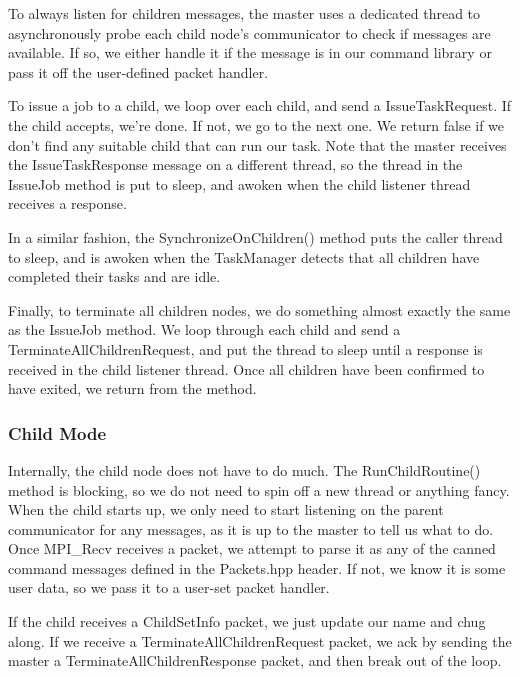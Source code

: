 \documentclass[11pt]{article}
\begin{document}
                To always listen for children messages, the master uses a dedicated thread to asynchronously probe
                each child node's communicator to check if messages are available. If so, we either handle it if 
                the message is in our command library or pass it off the user-defined packet handler.
                
                To issue a job to a child, we loop over each child, and send a IssueTaskRequest. If the child
                accepts, we're done. If not, we go to the next one. We return false if we don't find any suitable
                child that can run our task. Note that the master receives the IssueTaskResponse message on
                a different thread, so the thread in the IssueJob method is put to sleep, and awoken when the
                child listener thread receives a response. 
                
                In a similar fashion, the SynchronizeOnChildren() method puts the caller thread to sleep, and
                is awoken when the TaskManager detects that all children have completed their tasks and are idle.
                
                Finally, to terminate all children nodes, we do something almost exactly the same as the IssueJob
                method. We loop through each child and send a TerminateAllChildrenRequest, and put the thread to sleep
                until a response is received in the child listener thread. Once all children have been confirmed
                to have exited, we return from the method.
            
            \subsubsection{Child Mode}
                Internally, the child node does not have to do much. The RunChildRoutine() method is blocking,
                so we do not need to spin off a new thread or anything fancy. When the child starts up,
                we only need to start listening on the parent communicator for any messages, as it is up to
                the master to tell us what to do. Once MPI\_Recv receives a packet, we attempt to parse it
                as any of the canned command messages defined in the Packets.hpp header. If not, we know it is
                some user data, so we pass it to a user-set packet handler. 
                
                If the child receives a ChildSetInfo packet, we just update our name and chug along. If we receive
                a TerminateAllChildrenRequest packet, we ack by sending the master a TerminateAllChildrenResponse
                packet, and then break out of the loop. 
                
\end{document}
